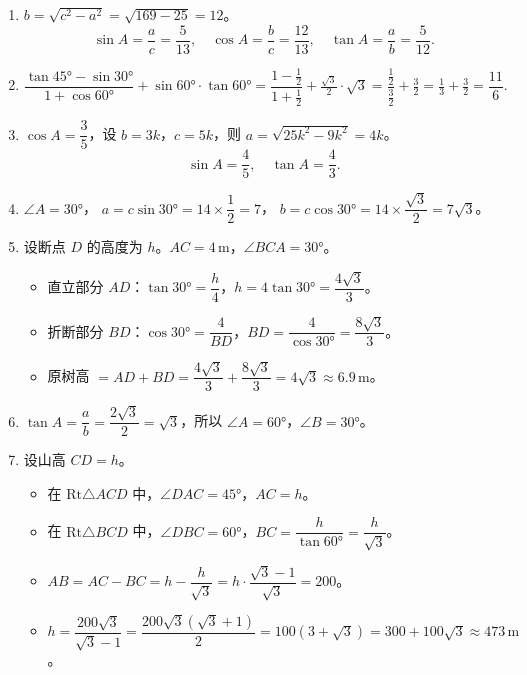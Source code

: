 \documentclass[12pt, a4paper]{ctexart}
\begin{document}
\begin{knowledgebox}[参考答案]
\begin{enumerate}
  \item $b=\sqrt{c^2-a^2}=\sqrt{169-25}=12$。
  \[
  \sin A=\frac{a}{c}=\frac{5}{13},\quad
  \cos A=\frac{b}{c}=\frac{12}{13},\quad
  \tan A=\frac{a}{b}=\frac{5}{12}.
  \]

  \item $\dfrac{\tan45°-\sin30°}{1+\cos60°}+\sin60°\cdot\tan60°
  =\dfrac{1-\frac{1}{2}}{1+\frac{1}{2}}+\frac{\sqrt{3}}{2}\cdot\sqrt{3}
  =\dfrac{\frac{1}{2}}{\frac{3}{2}}+\frac{3}{2}
  =\frac{1}{3}+\frac{3}{2}
  =\boxed{\dfrac{11}{6}}.$

  \item $\cos A=\dfrac{3}{5}$，设 $b=3k$，$c=5k$，则 $a=\sqrt{25k^2-9k^2}=4k$。
  \[
  \sin A=\frac{4}{5},\quad \tan A=\frac{4}{3}.
  \]

  \item $\angle A=30°$，
  $a=c\sin30°=14\times\dfrac{1}{2}=\boxed{7}$，
  $b=c\cos30°=14\times\dfrac{\sqrt{3}}{2}=\boxed{7\sqrt{3}}$。

  \item 设断点 $D$ 的高度为 $h$。$AC=4\,\text{m}$，$\angle BCA=30°$。
  \begin{itemize}[nosep]
    \item 直立部分 $AD$：$\tan30°=\dfrac{h}{4}$，$h=4\tan30°=\dfrac{4\sqrt{3}}{3}$。
    \item 折断部分 $BD$：$\cos30°=\dfrac{4}{BD}$，$BD=\dfrac{4}{\cos30°}=\dfrac{8\sqrt{3}}{3}$。
    \item 原树高 $=AD+BD=\dfrac{4\sqrt{3}}{3}+\dfrac{8\sqrt{3}}{3}=4\sqrt{3}\approx\boxed{6.9}\,\text{m}$。
  \end{itemize}

  \item $\tan A=\dfrac{a}{b}=\dfrac{2\sqrt{3}}{2}=\sqrt{3}$，所以 $\angle A=60°$，$\angle B=30°$。

  \item 设山高 $CD=h$。
  \begin{itemize}[nosep]
    \item 在 $\text{Rt}\triangle ACD$ 中，$\angle DAC=45°$，$AC=h$。
    \item 在 $\text{Rt}\triangle BCD$ 中，$\angle DBC=60°$，$BC=\dfrac{h}{\tan60°}=\dfrac{h}{\sqrt{3}}$。
    \item $AB=AC-BC=h-\dfrac{h}{\sqrt{3}}=h\cdot\dfrac{\sqrt{3}-1}{\sqrt{3}}=200$。
    \item $h=\dfrac{200\sqrt{3}}{\sqrt{3}-1}=\dfrac{200\sqrt{3}(\sqrt{3}+1)}{2}=100(3+\sqrt{3})=300+100\sqrt{3}\approx\boxed{473}\,\text{m}$。
  \end{itemize}


\end{enumerate}
\end{knowledgebox}
\end{document}

